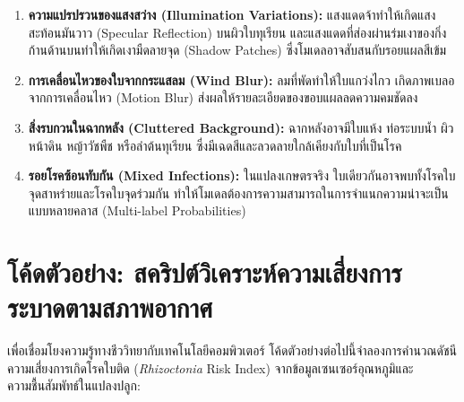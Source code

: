 \begin{enumerate}[leftmargin=1.8em, itemsep=3pt]
    \item \textbf{ความแปรปรวนของแสงสว่าง (Illumination Variations):} แสงแดดจ้าทำให้เกิดแสงสะท้อนมันวาว (Specular Reflection) บนผิวใบทุเรียน และแสงแดดที่ส่องผ่านร่มเงาของกิ่งก้านด้านบนทำให้เกิดเงามืดลายจุด (Shadow Patches) ซึ่งโมเดลอาจสับสนกับรอยแผลสีเข้ม
    \item \textbf{การเคลื่อนไหวของใบจากกระแสลม (Wind Blur):} ลมที่พัดทำให้ใบแกว่งไกว เกิดภาพเบลอจากการเคลื่อนไหว (Motion Blur) ส่งผลให้รายละเอียดของขอบแผลลดความคมชัดลง
    \item \textbf{สิ่งรบกวนในฉากหลัง (Cluttered Background):} ฉากหลังอาจมีใบแห้ง ท่อระบบน้ำ ผิวหน้าดิน หญ้าวัชพืช หรือลำต้นทุเรียน ซึ่งมีเฉดสีและลวดลายใกล้เคียงกับใบที่เป็นโรค
    \item \textbf{รอยโรคซ้อนทับกัน (Mixed Infections):} ในแปลงเกษตรจริง ใบเดียวกันอาจพบทั้งโรคใบจุดสาหร่ายและโรคใบจุดร่วมกัน ทำให้โมเดลต้องการความสามารถในการจำแนกความน่าจะเป็นแบบหลายคลาส (Multi-label Probabilities)
\end{enumerate}

\section{โค้ดตัวอย่าง: สคริปต์วิเคราะห์ความเสี่ยงการระบาดตามสภาพอากาศ}

เพื่อเชื่อมโยงความรู้ทางชีววิทยากับเทคโนโลยีคอมพิวเตอร์ โค้ดตัวอย่างต่อไปนี้จำลองการคำนวณดัชนีความเสี่ยงการเกิดโรคใบติด (\textit{Rhizoctonia} Risk Index) จากข้อมูลเซนเซอร์อุณหภูมิและความชื้นสัมพัทธ์ในแปลงปลูก:

